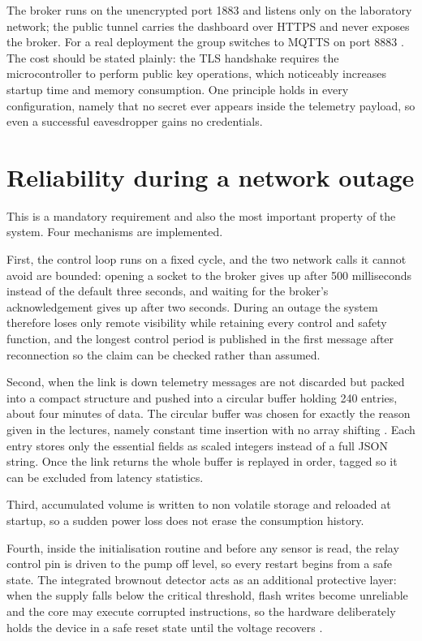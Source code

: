 The broker runs on the unencrypted port 1883 and listens only on the laboratory network; the public tunnel carries the dashboard over HTTPS and never exposes the broker. For a real deployment the group switches to MQTTS on port 8883 \cite{slide03, rfc8446}. The cost should be stated plainly: the TLS handshake requires the microcontroller to perform public key operations, which noticeably increases startup time and memory consumption. One principle holds in every configuration, namely that no secret ever appears inside the telemetry payload, so even a successful eavesdropper gains no credentials.

\section{Reliability during a network outage}

This is a mandatory requirement and also the most important property of the system. Four mechanisms are implemented.

First, the control loop runs on a fixed cycle, and the two network calls it cannot avoid are bounded: opening a socket to the broker gives up after 500 milliseconds instead of the default three seconds, and waiting for the broker's acknowledgement gives up after two seconds. During an outage the system therefore loses only remote visibility while retaining every control and safety function, and the longest control period is published in the first message after reconnection so the claim can be checked rather than assumed.

Second, when the link is down telemetry messages are not discarded but packed into a compact structure and pushed into a circular buffer holding 240 entries, about four minutes of data. The circular buffer was chosen for exactly the reason given in the lectures, namely constant time insertion with no array shifting \cite{slide01}. Each entry stores only the essential fields as scaled integers instead of a full JSON string. Once the link returns the whole buffer is replayed in order, tagged so it can be excluded from latency statistics.

Third, accumulated volume is written to non volatile storage and reloaded at startup, so a sudden power loss does not erase the consumption history.

Fourth, inside the initialisation routine and before any sensor is read, the relay control pin is driven to the pump off level, so every restart begins from a safe state. The integrated brownout detector acts as an additional protective layer: when the supply falls below the critical threshold, flash writes become unreliable and the core may execute corrupted instructions, so the hardware deliberately holds the device in a safe reset state until the voltage recovers \cite{slide01}.

